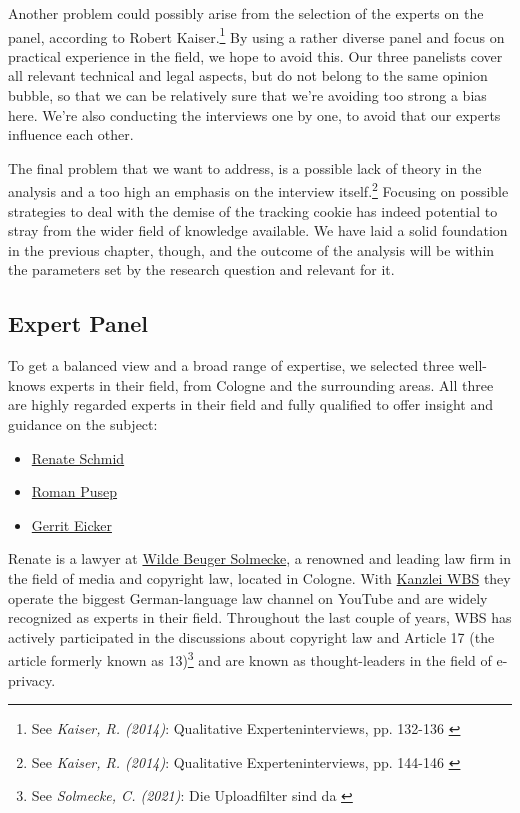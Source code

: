 Another problem could possibly arise from the selection of the experts on the panel, according to Robert Kaiser.\footnote{See \textit{Kaiser, R. (2014)}: Qualitative Experteninterviews, pp. 132-136 \cite{expertInterviews}} By using a rather diverse panel and focus on practical experience in the field, we hope to avoid this. Our three panelists cover all relevant technical and legal aspects, but do not belong to the same opinion bubble, so that we can be relatively sure that we're avoiding too strong a bias here. We're also conducting the interviews one by one, to avoid that our experts influence each other.

The final problem that we want to address, is a possible lack of theory in the analysis and a too high an emphasis on the interview itself.\footnote{See \textit{Kaiser, R. (2014)}: Qualitative Experteninterviews, pp. 144-146 \cite{expertInterviews}} Focusing on possible strategies to deal with the demise of the tracking cookie has indeed potential to stray from the wider field of knowledge available. We have laid a solid foundation in the previous chapter, though, and the outcome of the analysis will be within the parameters set by the research question and relevant for it.

\subsection{Expert Panel}

To get a balanced view and a broad range of expertise, we selected three well-knows experts in their field, from Cologne and the surrounding areas. All three are highly regarded experts in their field and fully qualified to offer insight and guidance on the subject:

\begin{itemize}
 \item \href{https://www.linkedin.com/in/renate-schmid-535233113/}{Renate Schmid}
 \item \href{https://www.linkedin.com/in/roman-pusep-36b33374/}{Roman Pusep}
 \item \href{https://www.linkedin.com/in/eicker/}{Gerrit Eicker}
\end{itemize}

Renate is a lawyer at \href{https://www.wbs-law.de/}{Wilde Beuger Solmecke}, a renowned and leading law firm in the field of media and copyright law, located in Cologne. With \href{https://www.youtube.com/user/KanzleiWBS}{Kanzlei WBS} they operate the biggest German-language law channel on YouTube and are widely recognized as experts in their field. Throughout the last couple of years, WBS has actively participated in the discussions about copyright law and Article 17 (the article formerly known as 13)\footnote{See \textit{Solmecke, C. (2021)}: Die Uploadfilter sind da \cite{article17}} and are known as thought-leaders in the field of e-privacy.

